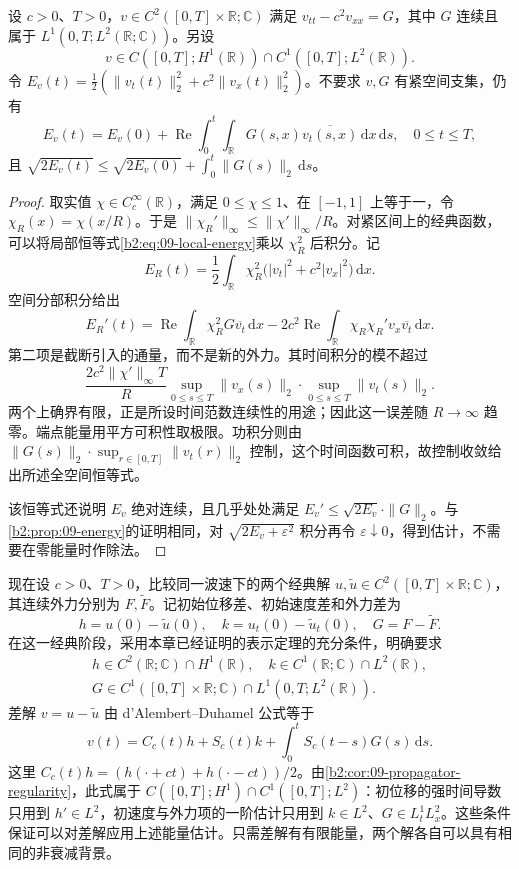 \begin{lemma}[有限能量经典解的截断]\label{b2:lem:09-finite-energy-classical}
设 \(c>0\)、\(T>0\)，\(v\in C^2([0,T]\times\mathbb R;\mathbb C)\) 满足 \(v_{tt}-c^2v_{xx}=G\)，其中 \(G\) 连续且属于 \(L^1(0,T;L^2(\mathbb R;\mathbb C))\)。另设
\[
 v\in C([0,T];H^1(\mathbb R))\cap C^1([0,T];L^2(\mathbb R)).
\]
令 \(E_v(t)=\frac12(\|v_t(t)\|_2^2+c^2\|v_x(t)\|_2^2)\)。不要求 \(v,G\) 有紧空间支集，仍有
\[
 E_v(t)=E_v(0)+\operatorname{Re}\int_0^t\int_{\mathbb R}
 G(s,x)\overline{v_t(s,x)}\,\mathrm{d}x\,\mathrm{d}s,
\quad 0\leq t\leq T,
\]
且 \(\sqrt{2E_v(t)}\leq\sqrt{2E_v(0)}+\int_0^t\|G(s)\|_2\,\mathrm{d}s\)。
\end{lemma}
\begin{proof}
取实值 \(\chi\in C_c^\infty(\mathbb R)\)，满足 \(0\leq\chi\leq1\)、在 \([-1,1]\) 上等于一，令 \(\chi_R(x)=\chi(x/R)\)。于是 \(\|\chi_R'\|_\infty\leq\|\chi'\|_\infty/R\)。对紧区间上的经典函数，可以将局部恒等式\eqref{b2:eq:09-local-energy}乘以 \(\chi_R^2\) 后积分。记
\[
 E_R(t)=\frac12\int_{\mathbb R}\chi_R^2\bigl(|v_t|^2+c^2|v_x|^2\bigr)\,\mathrm{d}x.
\]
空间分部积分给出
\[
 E_R'(t)=\operatorname{Re}\int_{\mathbb R}\chi_R^2G\overline{v_t}\,\mathrm{d}x
 -2c^2\operatorname{Re}\int_{\mathbb R}\chi_R\chi_R'v_x\overline{v_t}\,\mathrm{d}x.
\]
第二项是截断引入的通量，而不是新的外力。其时间积分的模不超过
\[
 \frac{2c^2\|\chi'\|_\infty T}{R}
 \sup_{0\leq s\leq T}\|v_x(s)\|_2\cdot
 \sup_{0\leq s\leq T}\|v_t(s)\|_2.
\]
两个上确界有限，正是所设时间范数连续性的用途；因此这一误差随 \(R\to\infty\) 趋零。端点能量用平方可积性取极限。功积分则由 \(\|G(s)\|_2\cdot\sup_{r\in[0,T]}\|v_t(r)\|_2\) 控制，这个时间函数可积，故控制收敛给出所述全空间恒等式。

该恒等式还说明 \(E_v\) 绝对连续，且几乎处处满足 \(E_v'\leq\sqrt{2E_v}\cdot\|G\|_2\)。与\cref{b2:prop:09-energy}的证明相同，对 \(\sqrt{2E_v+\varepsilon^2}\) 积分再令 \(\varepsilon\downarrow0\)，得到估计，不需要在零能量时作除法。
\end{proof}

现在设 \(c>0\)、\(T>0\)，比较同一波速下的两个经典解 \(u,\widetilde u\in C^2([0,T]\times\mathbb R;\mathbb C)\)，其连续外力分别为 \(F,\widetilde F\)。记初始位移差、初始速度差和外力差为
\[
 h=u(0)-\widetilde u(0),\quad k=u_t(0)-\widetilde u_t(0),\quad G=F-\widetilde F.
\]
在这一经典阶段，采用本章已经证明的表示定理的充分条件，明确要求
\[
 \begin{gathered}
 h\in C^2(\mathbb R;\mathbb C)\cap H^1(\mathbb R),\quad
 k\in C^1(\mathbb R;\mathbb C)\cap L^2(\mathbb R),\\
 G\in C^1([0,T]\times\mathbb R;\mathbb C)\cap L^1(0,T;L^2(\mathbb R)).
 \end{gathered}
\]
差解 \(v=u-\widetilde u\) 由 d'Alembert--Duhamel 公式等于
\[
 v(t)=C_c(t)h+S_c(t)k+\int_0^tS_c(t-s)G(s)\,\mathrm{d}s.
\]
这里 \(C_c(t)h=(h(\cdot+ct)+h(\cdot-ct))/2\)。由\cref{b2:cor:09-propagator-regularity}，此式属于 \(C([0,T];H^1)\cap C^1([0,T];L^2)\)：初位移的强时间导数只用到 \(h'\in L^2\)，初速度与外力项的一阶估计只用到 \(k\in L^2\)、\(G\in L^1_tL^2_x\)。这些条件保证可以对差解应用上述能量估计。只需差解有有限能量，两个解各自可以具有相同的非衰减背景。

